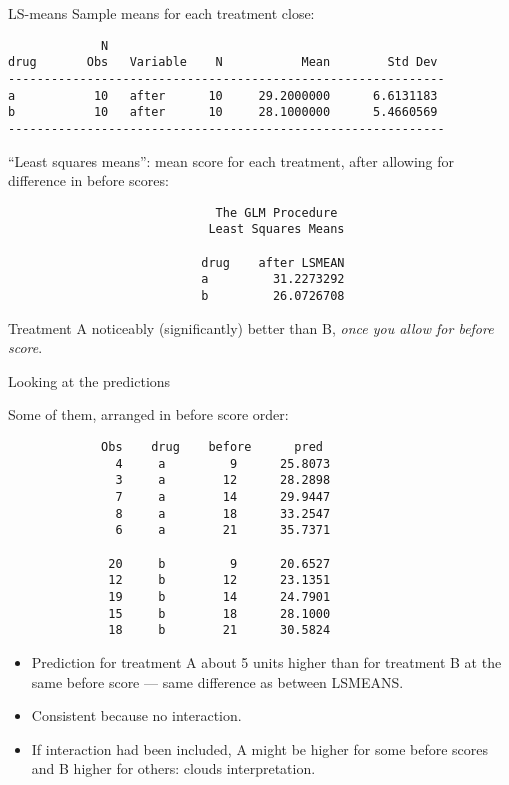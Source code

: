 \documentclass[pdf]{prosper}
\begin{document}
\begin{slide}{LS-means}
Sample means for each treatment close:

{\scriptsize
\begin{verbatim}
             N
drug       Obs   Variable    N           Mean        Std Dev 
-------------------------------------------------------------
a           10   after      10     29.2000000      6.6131183 
b           10   after      10     28.1000000      5.4660569 
-------------------------------------------------------------

\end{verbatim}
}

``Least squares means'': mean score for each treatment, after allowing for difference in before scores:

{\scriptsize
\begin{verbatim}
                             The GLM Procedure
                            Least Squares Means

                           drug    after LSMEAN
                           a         31.2273292
                           b         26.0726708
\end{verbatim}
}

Treatment A noticeably (significantly) better than B, {\em once you allow for before score}.
  
\end{slide}

\begin{slide}{Looking at the predictions}

Some of them, arranged in before score order:

{\scriptsize
\begin{verbatim}
             Obs    drug    before      pred
               4     a         9      25.8073
               3     a        12      28.2898
               7     a        14      29.9447
               8     a        18      33.2547
               6     a        21      35.7371

              20     b         9      20.6527
              12     b        12      23.1351
              19     b        14      24.7901
              15     b        18      28.1000
              18     b        21      30.5824

\end{verbatim}
}

\begin{itemize}
\item Prediction for treatment A about 5 units higher than for treatment B at the same before score --- same difference as between LSMEANS.
\item Consistent because no interaction.
\item If interaction had been included, A might be higher for some before scores and B higher for others: clouds interpretation.
\end{itemize}
  
\end{slide}
\end{document}
